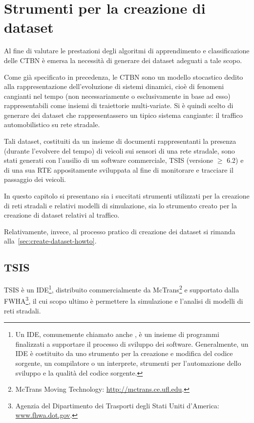 
\chapter{Strumenti per la creazione di dataset}
\label{cap:tsis-sensors}
Al fine di valutare le prestazioni degli algoritmi di apprendimento e classificazione delle \acl{CTBN} è emersa la necessità di generare dei dataset adeguati a tale scopo.

Come già specificato in precedenza, le \acs{CTBN} sono un modello stocastico dedito alla rappresentazione dell'evoluzione di sistemi dinamici, cioè di fenomeni cangianti nel tempo (non necessariamente o esclusivamente in base ad esso) rappresentabili come insiemi di traiettorie multi-variate. Si è quindi scelto di generare dei dataset che rappresentassero un tipico sistema cangiante: il traffico automobilistico su rete stradale.

Tali dataset, costituiti da un insieme di documenti rappresentanti la presenza (durante l'evolvere del tempo) di veicoli sui sensori di una rete stradale, sono stati generati con l'ausilio di un software commerciale, \acf{TSIS} (versione $\geq$ 6.2) e di una sua \acl{RTE} appositamente sviluppata al fine di monitorare e tracciare il passaggio dei veicoli. 

In questo capitolo si presentano sia i succitati strumenti utilizzati per la creazione di reti stradali e relativi modelli di simulazione, sia lo strumento creato per la creazione di dataset relativi al traffico.

Relativamente, invece, al processo pratico di creazione dei dataset si rimanda alla~\autoref{sec:create-dataset-howto}.

\section{TSIS}
\label{sec:tsis}
\acf{TSIS} è un \acl{IDE}\footnote{Un \acl{IDE}, comunemente chiamato anche , è un insieme di programmi finalizzati a supportare il processo di sviluppo dei software. Generalmente, un \acs{IDE} è costituito da uno strumento per la creazione e modifica del codice sorgente, un compilatore o un interprete, strumenti per l'automazione dello sviluppo e la qualità del codice sorgente.}, distribuito commercialmente da McTrans\footnote{McTrans Moving Technology: \url{http://mctrans.ce.ufl.edu}.} e supportato dalla \acf{FWHA}\footnote{Agenzia del Dipartimento dei Trasporti degli Stati Uniti d'America: \\ \url{www.fhwa.dot.gov}.}, il cui scopo ultimo è permettere la simulazione e l'analisi di modelli di reti stradali.

